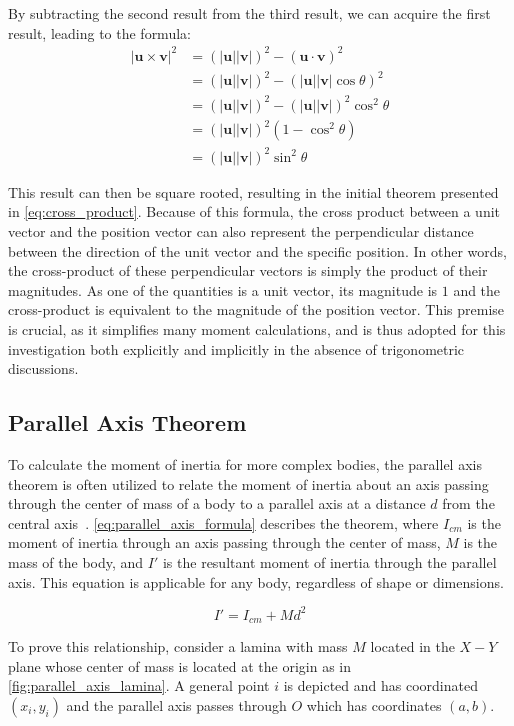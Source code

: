 By subtracting the second result from the third result, we can acquire the first result, leading to the formula:
\begin{align*}
|\bm{u} \times \bm{v}|^2 &= (|\bm{u}||\bm{v}|)^2 - (\bm{u} \cdot \bm{v})^2 \\
&= (|\bm{u}||\bm{v}|)^2 - (|\bm{u}||\bm{v}|\cos{\theta})^2 \\
&= (|\bm{u}||\bm{v}|)^2 - (|\bm{u}||\bm{v}|)^2\cos^2{\theta} \\
&= (|\bm{u}||\bm{v}|)^2(1 - \cos^2{\theta}) \\
&= (|\bm{u}||\bm{v}|)^2\sin^2{\theta}
\end{align*}

This result can then be square rooted, resulting in the initial theorem presented in \cref{eq:cross_product}. Because of this formula, the cross product between a unit vector and the position vector can also represent the perpendicular distance between the direction of the unit vector and the specific position. In other words, the cross-product of these perpendicular vectors is simply the product of their magnitudes. As one of the quantities is a unit vector, its magnitude is $1$ and the cross-product is equivalent to the magnitude of the position vector. This premise is crucial, as it simplifies many moment calculations, and is thus adopted for this investigation both explicitly and implicitly in the absence of trigonometric discussions.

\subsection{Parallel Axis Theorem}

To calculate the moment of inertia for more complex bodies, the parallel axis theorem is often utilized to relate the moment of inertia about an axis passing through the center of mass of a body to a parallel axis at a distance $d$ from the central axis~\parencite{Abdulghany_2017}. \cref{eq:parallel_axis_formula} describes the theorem, where $I_{cm}$ is the moment of inertia through an axis passing through the center of mass, $M$ is the mass of the body, and $I'$ is the resultant moment of inertia through the parallel axis. This equation is applicable for any body, regardless of shape or dimensions.

\begin{equation}
I' = I_{cm} + Md^2
\label{eq:parallel_axis_formula}
\end{equation}

To prove this relationship, consider a lamina with mass $M$ located in the $X-Y$ plane whose center of mass is located at the origin as in \cref{fig:parallel_axis_lamina}. A general point $i$ is depicted and has coordinated $(x_i, y_i)$ and the parallel axis passes through $O$ which has coordinates $(a, b)$.

